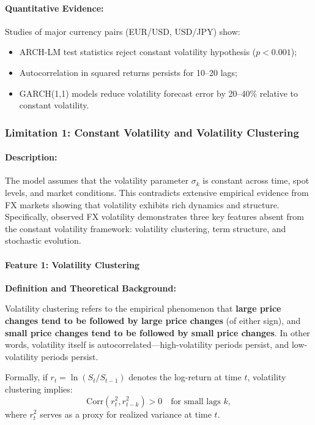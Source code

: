 \paragraph{Quantitative Evidence:}
Studies of major currency pairs (EUR/USD, USD/JPY) show:
\begin{itemize}
	\item ARCH-LM test statistics reject constant volatility hypothesis ($p < 0.001$);
	\item Autocorrelation in squared returns persists for 10--20 lags;
	\item GARCH(1,1) models reduce volatility forecast error by 20--40\% relative to constant volatility.
\end{itemize}



\newpage
\subsubsection{Limitation 1: Constant Volatility and Volatility Clustering}

\paragraph{Description:}
The model assumes that the volatility parameter $\sigma_k$ is constant across time, spot levels, and market conditions. This contradicts extensive empirical evidence from FX markets showing that volatility exhibits rich dynamics and structure. Specifically, observed FX volatility demonstrates three key features absent from the constant volatility framework: volatility clustering, term structure, and stochastic evolution.

\paragraph{Feature 1: Volatility Clustering}

\textbf{Definition and Theoretical Background:}

Volatility clustering refers to the empirical phenomenon that \textbf{large price changes tend to be followed by large price changes} (of either sign), and \textbf{small price changes tend to be followed by small price changes}. In other words, volatility itself is autocorrelated—high-volatility periods persist, and low-volatility periods persist.

Formally, if $r_t = \ln(S_t/S_{t-1})$ denotes the log-return at time $t$, volatility clustering implies:
\begin{equation}
	\text{Corr}(r_t^2, r_{t-k}^2) > 0 \quad \text{for small lags } k,
\end{equation}
where $r_t^2$ serves as a proxy for realized variance at time $t$. 

